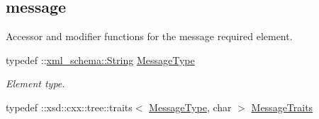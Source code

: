 \subsection*{message}
\label{_amgrp78e731027d8fd50ed642340b7c9a63b3}
Accessor and modifier functions for the message required element. \begin{DoxyCompactItemize}
\item 
\hypertarget{classopenstack_1_1xml_1_1CloudServersAPIFault_aff7b9d2067747fa033a0ea4408011af6}{
typedef ::\hyperlink{namespacexml__schema_af6757b5701ccc893f3b551bd70e0c94d}{xml\_\-schema::String} \hyperlink{classopenstack_1_1xml_1_1CloudServersAPIFault_aff7b9d2067747fa033a0ea4408011af6}{MessageType}}
\label{classopenstack_1_1xml_1_1CloudServersAPIFault_aff7b9d2067747fa033a0ea4408011af6}

\begin{DoxyCompactList}\small\item\em Element type. \item\end{DoxyCompactList}\item 
\hypertarget{classopenstack_1_1xml_1_1CloudServersAPIFault_abe2fec573fce5907b6d664fcce3340ef}{
typedef ::xsd::cxx::tree::traits$<$ \hyperlink{classopenstack_1_1xml_1_1CloudServersAPIFault_aff7b9d2067747fa033a0ea4408011af6}{MessageType}, char $>$ \hyperlink{classopenstack_1_1xml_1_1CloudServersAPIFault_abe2fec573fce5907b6d664fcce3340ef}{MessageTraits}}
\label{classopenstack_1_1xml_1_1CloudServersAPIFault_abe2fec573fce5907b6d664fcce3340ef}


\end{DoxyCompactItemize}
